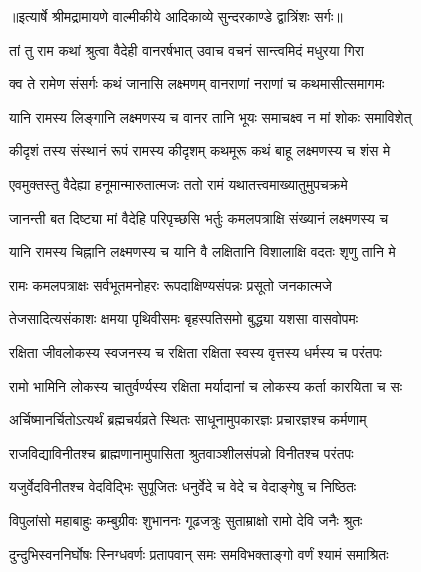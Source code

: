 {॥इत्यार्षे श्रीमद्रामायणे वाल्मीकीये आदिकाव्ये सुन्दरकाण्डे द्वात्रिंशः सर्गः॥}


\twolineshloka
{तां तु राम कथां श्रुत्वा वैदेही वानरर्षभात्}
{उवाच वचनं सान्त्वमिदं मधुरया गिरा} %

\twolineshloka
{क्व ते रामेण संसर्गः कथं जानासि लक्ष्मणम्}
{वानराणां नराणां च कथमासीत्समागमः} %

\twolineshloka
{यानि रामस्य लिङ्गानि लक्ष्मणस्य च वानर}
{तानि भूयः समाचक्ष्व न मां शोकः समाविशेत्} %

\twolineshloka
{कीदृशं तस्य संस्थानं रूपं रामस्य कीदृशम्}
{कथमूरू कथं बाहू लक्ष्मणस्य च शंस मे} %

\twolineshloka
{एवमुक्तस्तु वैदेह्या हनूमान्मारुतात्मजः}
{ततो रामं यथातत्त्वमाख्यातुमुपचक्रमे} %

\twolineshloka
{जानन्ती बत दिष्ट्या मां वैदेहि परिपृच्छसि}
{भर्तुः कमलपत्राक्षि संख्यानं लक्ष्मणस्य च} %

\twolineshloka
{यानि रामस्य चिह्नानि लक्ष्मणस्य च यानि वै}
{लक्षितानि विशालाक्षि वदतः शृणु तानि मे} %

\twolineshloka
{रामः कमलपत्राक्षः सर्वभूतमनोहरः}
{रूपदाक्षिण्यसंपन्नः प्रसूतो जनकात्मजे} %

\twolineshloka
{तेजसादित्यसंकाशः क्षमया पृथिवीसमः}
{बृहस्पतिसमो बुद्ध्या यशसा वासवोपमः} %

\twolineshloka
{रक्षिता जीवलोकस्य स्वजनस्य च रक्षिता}
{रक्षिता स्वस्य वृत्तस्य धर्मस्य च परंतपः} %

\twolineshloka
{रामो भामिनि लोकस्य चातुर्वर्ण्यस्य रक्षिता}
{मर्यादानां च लोकस्य कर्ता कारयिता च सः} %

\twolineshloka
{अर्चिष्मानर्चितोऽत्यर्थं ब्रह्मचर्यव्रते स्थितः}
{साधूनामुपकारज्ञः प्रचारज्ञश्च कर्मणाम्} %

\twolineshloka
{राजविद्याविनीतश्च ब्राह्मणानामुपासिता}
{श्रुतवाञ्शीलसंपन्नो विनीतश्च परंतपः} %

\twolineshloka
{यजुर्वेदविनीतश्च वेदविद्भिः सुपूजितः}
{धनुर्वेदे च वेदे च वेदाङ्गेषु च निष्ठितः} %

\twolineshloka
{विपुलांसो महाबाहुः कम्बुग्रीवः शुभाननः}
{गूढजत्रुः सुताम्राक्षो रामो देवि जनैः श्रुतः} %

\twolineshloka
{दुन्दुभिस्वननिर्घोषः स्निग्धवर्णः प्रतापवान्}
{समः समविभक्ताङ्गो वर्णं श्यामं समाश्रितः} %

